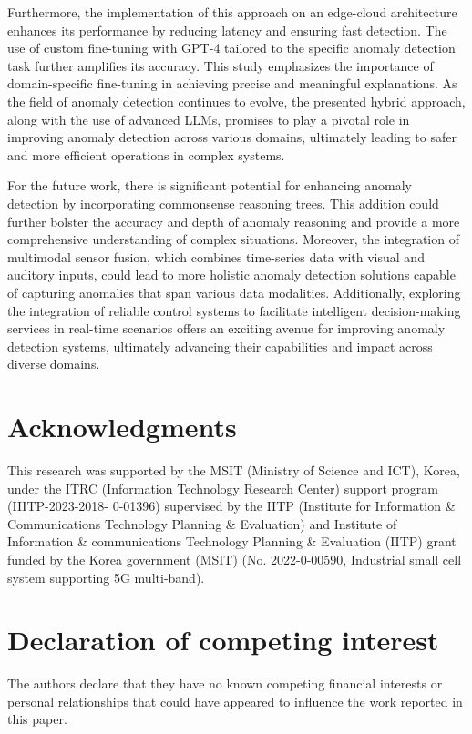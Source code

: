 \documentclass[final,3p,times,twocolumn]{elsarticle}
\begin{document}
Furthermore, the implementation of this approach on an edge-cloud architecture enhances its performance by reducing latency and ensuring fast detection. The use of custom fine-tuning with GPT-4 tailored to the specific anomaly detection task further amplifies its accuracy. This study emphasizes the importance of domain-specific fine-tuning in achieving precise and meaningful explanations. As the field of anomaly detection continues to evolve, the presented hybrid approach, along with the use of advanced LLMs, promises to play a pivotal role in improving anomaly detection across various domains, ultimately leading to safer and more efficient operations in complex systems.

For the future work, there is significant potential for enhancing anomaly detection by incorporating commonsense reasoning trees. This addition could further bolster the accuracy and depth of anomaly reasoning and provide a more comprehensive understanding of complex situations. Moreover, the integration of multimodal sensor fusion, which combines time-series data with visual and auditory inputs, could lead to more holistic anomaly detection solutions capable of capturing anomalies that span various data modalities. Additionally, exploring the integration of reliable control systems to facilitate intelligent decision-making services in real-time scenarios offers an exciting avenue for improving anomaly detection systems, ultimately advancing their capabilities and impact across diverse domains.

\section*{Acknowledgments}
This research was supported by the MSIT (Ministry of Science and ICT), Korea, under the ITRC (Information Technology Research Center) support program (IIITP-2023-2018-
0-01396) supervised by the IITP (Institute for Information \& Communications Technology Planning \& Evaluation) and Institute of Information \& communications Technology Planning \& Evaluation (IITP) grant funded by the Korea government (MSIT) (No. 2022-0-00590, Industrial small cell system supporting 5G multi-band).

\section*{Declaration of competing interest}
The authors declare that they have no known competing financial interests or personal relationships that could have appeared to influence the work reported in this paper.
\end{document}
